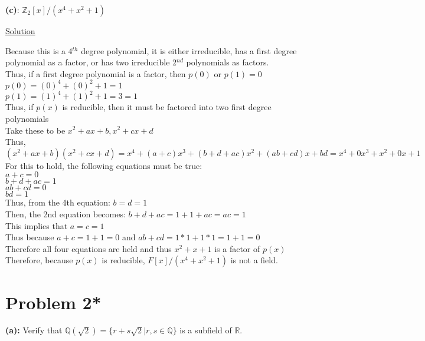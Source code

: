 \documentclass{article} %
\begin{document}
\textbf{(c)}: $\mathbb{Z}_2[x]/(x^4+x^2+1)$
\begin{addmargin}[1em]{0em}
\underline{Solution}
\begin{addmargin}[1em]{0em}
Because this is a 4$^{th}$ degree polynomial, it is either irreducible, has a first degree polynomial as a factor, or has two irreducible 2$^{nd}$ polynomials as factors.
\\Thus, if a first degree polynomial is a factor, then $p(0)$ or $p(1)= 0$
\\$p(0) = (0)^4 + (0)^2 + 1 = 1$
\\$p(1) = (1)^4 + (1)^2 + 1 = 3 = 1$
\\Thus, if $p(x)$ is reducible, then it must be factored into two first degree polynomials
\\Take these to be $x^2 + ax + b, x^2 + cx + d$
\\Thus, $(x^2 + ax + b)(x^2 + cx + d) = x^4 + (a + c)x^3 + (b + d +ac)x^2 + (ab + cd)x + bd = x^4 + 0x^3 + x^2 + 0x + 1$
\\For this to hold, the following equations must be true: 
\\$a + c = 0$
\\$b + d + ac = 1$
\\$ab + cd = 0$
\\$bd = 1$
\\Thus, from the 4th equation: $b = d = 1$
\\Then, the 2nd equation becomes: $b + d + ac = 1 + 1 + ac = ac = 1$
\\This implies that $a = c = 1$
\\Thus because $a + c = 1 + 1 = 0$ and $ab + cd = 1*1 + 1*1 = 1 + 1 = 0$
\\Therefore all four equations are held and thus $x^2 + x + 1$ is a factor of $p(x)$
\\Therefore, because $p(x)$ is reducible, $F[x]/(x^4 + x^2 + 1)$ is not a field.
\end{addmargin}
\end{addmargin}
    

\newpage

\section*{Problem 2*}

\textbf{(a):} Verify that $\mathbb{Q}(\sqrt{2}) = \{r+s\sqrt{2}|r,s \in \mathbb{Q}\}$ is a subfield of $\mathbb{R}$.
\\
\end{document}

